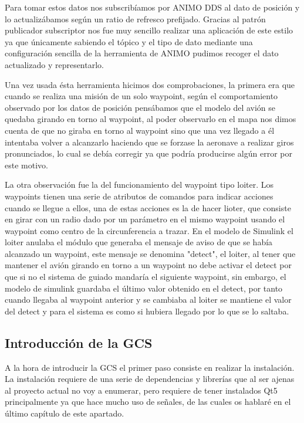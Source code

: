\documentclass[12pt,a4paper,spanish]{book} %
\begin{document}
Para tomar estos datos nos subscribíamos por ANIMO DDS al dato de posición y lo actualizábamos según un ratio de refresco prefijado. Gracias al patrón publicador subscriptor nos fue muy sencillo realizar una aplicación de este estilo ya que únicamente sabiendo el tópico y el tipo de dato mediante una configuración sencilla de la herramienta de ANIMO pudimos recoger el dato actualizado y representarlo.

Una vez usada ésta herramienta hicimos dos comprobaciones, la primera era que cuando se realiza una misión de un solo waypoint, según el comportamiento observado por los datos de posición pensábamos que el modelo del avión se quedaba girando en torno al waypoint, al poder observarlo en el mapa nos dimos cuenta de que no giraba en torno al waypoint sino que una vez llegado a él intentaba volver a alcanzarlo haciendo que se forzase la aeronave a realizar giros pronunciados, lo cual se debía corregir ya que podría producirse algún error por este motivo.

La otra observación fue la del funcionamiento del waypoint tipo loiter. Los waypoints tienen una serie de atributos de comandos para indicar acciones cuando se llegue a ellos, una de estas acciones es la de hacer lioter, que consiste en girar con un radio dado por un parámetro en el mismo waypoint usando el waypoint como centro de la circunferencia a trazar. En el modelo de Simulink el loiter anulaba el módulo que generaba el mensaje de aviso de que se había alcanzado un waypoint, este mensaje se denomina "detect", el loiter, al tener que mantener el avión girando en torno a un waypoint no debe activar el detect por que si no el sistema de guiado mandaría el siguiente waypoint, sin embargo, el modelo de simulink guardaba el último valor obtenido en el detect, por tanto cuando llegaba al waypoint anterior y se cambiaba al loiter se mantiene el valor del detect y para el sistema es como si hubiera llegado por lo que se lo saltaba.



\subsection{Introducción de la GCS}

\lettrine{A}{} la hora de introducir la GCS el primer paso consiste en realizar la instalación. La instalación requiere de una serie de dependencias y librerías que al ser ajenas al proyecto actual no voy a enumerar, pero requiere de tener instalados Qt5 principalmente ya que hace mucho uso de señales, de las cuales os hablaré en el último capítulo de este apartado. 
\end{document}
